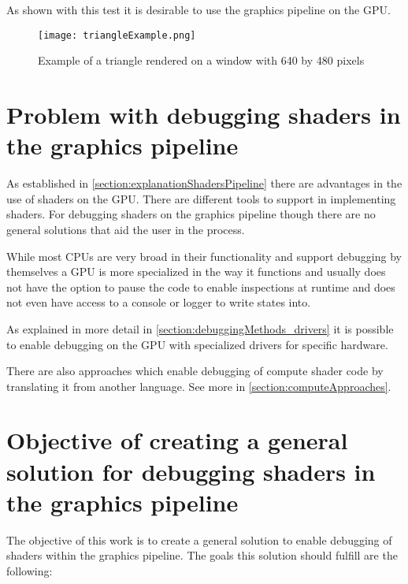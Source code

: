 As shown with this test it is desirable to use the graphics pipeline on the GPU.

\begin{figure}[h!]
  \centering 
  \texttt{[image: triangleExample.png]}
  \caption[Screenshot of triangle test render]{Example of a triangle rendered on a window with 640 by 480 pixels}
  \label{fig:triangleSample}
\end{figure}

\section{Problem with debugging shaders in the graphics pipeline}
\label{section:problems}

As established in \autoref{section:explanationShadersPipeline} there are advantages in the use of shaders on the GPU. There are different tools to support in implementing shaders. For debugging shaders on the graphics pipeline though there are no general solutions that aid the user in the process.

While most CPUs are very broad in their functionality and support debugging by themselves a GPU is more specialized in the way it functions and usually does not have the option to pause the code to enable inspections at runtime and does not even have access to a console or logger to write states into.

As explained in more detail in \autoref{section:debuggingMethods_drivers} it is possible to enable debugging on the GPU with specialized drivers for specific hardware.

There are also approaches which enable debugging of compute shader code by translating it from another language. See more in \autoref{section:computeApproaches}.

\section{Objective of creating a general solution for debugging shaders in the graphics pipeline}
\label{paragraph:objective}

The objective of this work is to create a general solution to enable debugging of shaders within the graphics pipeline. The goals this solution should fulfill are the following:

